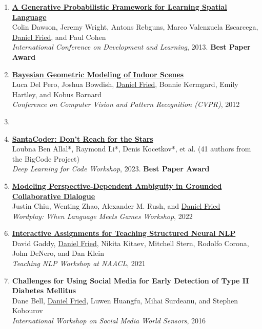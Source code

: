 \begin{enumerate}[leftmargin=-1mm,partopsep=0pt]
\item \href{https://people.eecs.berkeley.edu/~dfried/papers/ICDL2013.pdf}{\textbf{A Generative Probabilistic Framework for Learning Spatial Language}} \\
  Colin Dawson, Jeremy Wright, Antons Rebguns, Marco Valenzuela Escarcega, \underline{Daniel Fried}, and Paul Cohen\\
  \emph{International Conference on Development and Learning}, 2013. \textbf{Best Paper Award}

\item \href{https://people.eecs.berkeley.edu/~dfried/papers/Del-Pero-CVPR-12.pdf}{\textbf{Bayesian Geometric Modeling of Indoor Scenes}} \\
  Luca Del Pero, Joshua Bowdish, \underline{Daniel Fried}, Bonnie Kermgard, Emily Hartley, and Kobus Barnard\\
  \emph{Conference on Computer Vision and Pattern Recognition (CVPR)}, 2012

\item[]

\item \href{SantaCoder: Don't Reach for the Stars}{\textbf{SantaCoder: Don't Reach for the Stars}} \\
  Loubna Ben Allal*, Raymond Li*, Denis Kocetkov*, et al. (41 authors from the BigCode Project)\\
  \emph{Deep Learning for Code Workshop}, 2023. \textbf{Best Paper Award}

\item \href{https://openreview.net/pdf?id=PkHSHZLig5H}{\textbf{Modeling Perspective-Dependent Ambiguity in Grounded Collaborative Dialogue}} \\
  Justin Chiu, Wenting Zhao, Alexander M. Rush, and \underline{Daniel Fried}\\
  \emph{Wordplay: When Language Meets Games Workshop}, 2022

\item \href{http://nlp.cs.berkeley.edu/pubs/Gaddy-Fried-Kitaev-Stern-Corona-DeNero-Klein_2021_TeachingNLP_paper.pdf}{\textbf{Interactive Assignments for Teaching Structured Neural NLP}} \\
  David Gaddy, \underline{Daniel Fried}, Nikita Kitaev, Mitchell Stern, Rodolfo Corona, John DeNero, and Dan Klein\\
  \emph{Teaching NLP Workshop at NAACL}, 2021

\item \textbf{Challenges for Using Social Media for Early Detection of Type II Diabetes Mellitus} \\
  Dane Bell, \underline{Daniel Fried}, Luwen Huangfu, Mihai Surdeanu, and Stephen Kobourov\\
  \emph{International Workshop on Social Media World Sensors}, 2016


\end{enumerate}
